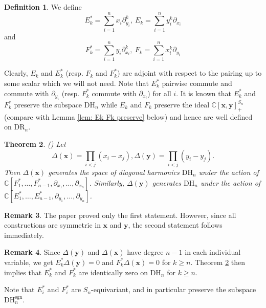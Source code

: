 \documentclass{amsart}
\newcommand{\C}{\mathbb{C}}
\newcommand{\xx}{\mathbf{x}}
\newcommand{\yy}{\mathbf{y}}
\newcommand{\DR}{\mathrm{DR}}
\renewcommand{\DH}{\mathrm{DH}}
\newcommand{\sgn}{\mathrm{sgn}}
\numberwithin{equation}{section}
\newtheorem{theorem}{Theorem}[section]
\theoremstyle{definition}
\newtheorem{remark}[theorem]{Remark}
\newtheorem{definition}[theorem]{Definition}
\begin{document}
\begin{definition}
We define 
\begin{equation}
\label{eq: def E algebra}
E_k^*=\sum_{i=1}^{n}x_i\partial_{y_i}^k,\ E_k=\sum_{i=1}^{n}y_i^k\partial_{x_i}
\end{equation}
and
\begin{equation}
\label{eq: def F algebra}
F_k^*=\sum_{i=1}^{n}y_i\partial_{x_i}^k,\ F_k=\sum_{i=1}^{n}x_i^k\partial_{y_i}
\end{equation}
\end{definition}
Clearly, $E_k$ and $E_k^*$ (resp. $F_k$ and $F_k^*$) are adjoint with respect to the pairing up to some scalar which we will not need.
Note that $E_k^*$ pairwise commute and commute with $\partial_{y_i}$ (resp. $F_k^*$ commute with $\partial_{x_i}$) for all $i$. It is known that $E_k^*$ and $F_k^*$ preserve the subspace $\DH_n$ while $E_k$ and $F_k$ preserve the ideal $\C[\xx,\yy]^{S_n}_+$ (compare with Lemma \ref{lem: Ek Fk preserve} below) and hence are well defined on $\DR_n$.

\begin{theorem}(\cite[Theorem 4.2]{HaimanInv})
\label{thm: operator conjecture}
Let $$\Delta(\xx)=\prod_{i<j}(x_i-x_j), \Delta(\yy)=\prod_{i<j}(y_i-y_j). $$ Then $\Delta(\xx)$ generates the space of diagonal harmonics $\DH_n$ under the action of $\C[F^*_1,\ldots,F_{n-1}^*,\partial_{x_1},\ldots,\partial_{x_n}]$.
Similarly,
$\Delta(\yy)$ generates $\DH_n$ under the action of $\C[E_1^*,\ldots,E_{n-1}^*,\partial_{y_1},\ldots,\partial_{y_n}]$. 
\end{theorem}

\begin{remark}
The paper \cite{HaimanInv} proved only the first statement. However, since all constructions are symmetric in $\xx$ and $\yy$, the second statement follows immediately.
\end{remark}

\begin{remark}
Since $\Delta(\yy)$  and $\Delta(\xx)$ have degree $n-1$ in each individual variable, we get $E_k^*\Delta(\yy)=0$ and $F_k^*\Delta(\xx)=0$ for $k\ge n$. Theorem \ref{thm: operator conjecture} then implies that $E_k^*$ and $F_k^*$ are identically zero on $\DH_n$ for $k\ge n$.
\end{remark}
 



Note that $E_i^*$ and $F_i^*$ are $S_n$-equivariant, and in particular preserve the subspace $\DH_n^{\sgn}$.
\end{document}
